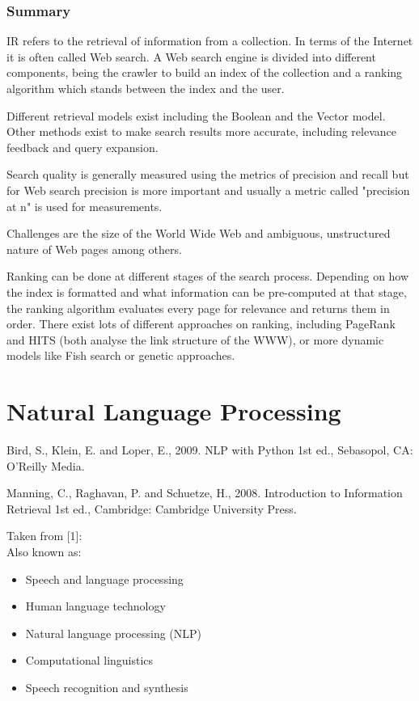 \subsubsection*{Summary}

IR refers to the retrieval of information from a collection. In terms of the Internet it is often called Web search. A Web search engine is divided into different components, being the crawler to build an index of the collection and a ranking algorithm which stands between the index and the user.

Different retrieval models exist including the Boolean and the Vector model. Other methods exist to make search results more accurate, including relevance feedback and query expansion.

Search quality is generally measured using the metrics of precision and recall but for Web search precision is more important and usually a metric called "precision at n" is used for measurements.

Challenges are the size of the World Wide Web and ambiguous, unstructured nature of Web pages among others.

Ranking can be done at different stages of the search process. Depending on how the index is formatted and what information can be pre-computed at that stage, the ranking algorithm evaluates every page for relevance and returns them in order. There exist lots of different approaches on ranking, including PageRank and HITS (both analyse the link structure of the WWW), or more dynamic models like Fish search or genetic approaches.

\section{Natural Language Processing}

\begin{comment}
  Damerau-Levensthein for clinamen!
\end{comment}

Bird, S., Klein, E. and Loper, E., 2009. NLP with Python 1st ed., Sebasopol, CA: O'Reilly Media.\citep{Bird2009}

Manning, C., Raghavan, P. and Schuetze, H., 2008. Introduction to Information Retrieval 1st ed., Cambridge: Cambridge University Press.\citep{Manning2009}

Taken from [1]:\citep{Jurafsky2009}\\
Also known as:\\
\begin{itemize}
  \item Speech and language processing
  \item Human language technology
  \item Natural language processing (NLP)
  \item Computational linguistics
  \item Speech recognition and synthesis
\end{itemize}

